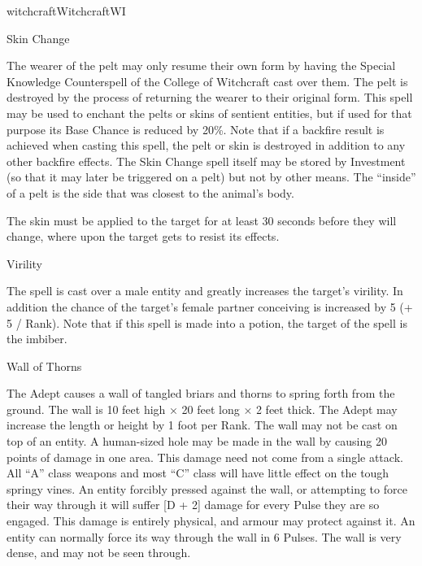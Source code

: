 \begin{College}[1.1]{witchcraft}{Witchcraft}{WI}
\begin{spell}[S-17]{Skin Change}
\begin{effects}
The wearer of the pelt may only resume their own form by having the
Special Knowledge Counterspell of the College of Witchcraft cast over
them.  The pelt is destroyed by the process of returning the wearer to
their original form. This spell may be used to enchant the pelts or
skins of sentient entities, but if used for that purpose its Base
Chance is reduced by 20\%.  Note that if a backfire result is achieved
when casting this spell, the pelt or skin is destroyed in addition to
any other backfire effects.  The Skin Change spell itself may be
stored by Investment (so that it may later be triggered on a pelt) but
not by other means. The “inside” of a pelt is the side that was
closest to the animal’s body.

The skin must be applied to the target for at least 30 seconds before
they will change, where upon the target gets to resist its effects.
\end{effects}
\end{spell}

\begin{spell}[S-18]{Virility}

\begin{effects}
The spell is cast over a male entity and greatly increases the
target’s virility.  In addition the chance of the target’s female
partner conceiving is increased by 5 (+ 5 / Rank). Note that if this
spell is made into a potion, the target of the spell is the imbiber.
\end{effects}
\end{spell}

\begin{spell}[S-19]{Wall of Thorns}

\begin{effects}
The Adept causes a wall of tangled briars and thorns to spring forth
from the ground.  The wall is 10 feet high × 20 feet long × 2 feet
thick.  The Adept may increase the length or height by 1 foot per
Rank. The wall may not be cast on top of an entity. A human-sized hole
may be made in the wall by causing 20 points of damage in one area.
This damage need not come from a single attack.  All “A” class weapons
and most “C” class will have little effect on the tough springy vines.
An entity forcibly pressed against the wall, or attempting to force
their way through it will suffer [D + 2] damage for every Pulse they
are so engaged.  This damage is entirely physical, and armour may
protect against it.  An entity can normally force its way through the
wall in 6 Pulses.  The wall is very dense, and may not be seen
through.
\end{effects}
\end{spell}



\end{College}
